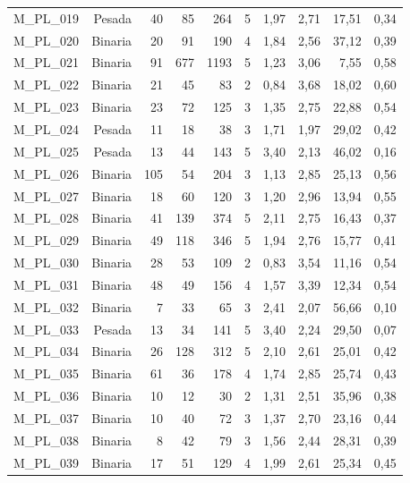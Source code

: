 \begin{table}[ht!]
\begin{tabular}{lrrrrrrrrr}
    M\_PL\_019 & Pesada & 40   & 85   & 264  & 5    & 1,97 & 2,71 & 17,51 & 0,34 \\
    M\_PL\_020 & Binaria & 20   & 91   & 190  & 4    & 1,84 & 2,56 & 37,12 & 0,39 \\
    M\_PL\_021 & Binaria & 91   & 677  & 1193 & 5    & 1,23 & 3,06 & 7,55 & 0,58 \\
    M\_PL\_022 & Binaria & 21   & 45   & 83   & 2    & 0,84 & 3,68 & 18,02 & 0,60 \\
    M\_PL\_023 & Binaria & 23   & 72   & 125  & 3    & 1,35 & 2,75 & 22,88 & 0,54 \\
    M\_PL\_024 & Pesada & 11   & 18   & 38   & 3    & 1,71 & 1,97 & 29,02 & 0,42 \\
    M\_PL\_025 & Pesada & 13   & 44   & 143  & 5    & 3,40 & 2,13 & 46,02 & 0,16 \\
    M\_PL\_026 & Binaria & 105  & 54   & 204  & 3    & 1,13 & 2,85 & 25,13 & 0,56 \\
    M\_PL\_027 & Binaria & 18   & 60   & 120  & 3    & 1,20 & 2,96 & 13,94 & 0,55 \\
    M\_PL\_028 & Binaria & 41   & 139  & 374  & 5    & 2,11 & 2,75 & 16,43 & 0,37 \\
    M\_PL\_029 & Binaria & 49   & 118  & 346  & 5    & 1,94 & 2,76 & 15,77 & 0,41 \\
    M\_PL\_030 & Binaria & 28   & 53   & 109  & 2    & 0,83 & 3,54 & 11,16 & 0,54 \\
    M\_PL\_031 & Binaria & 48   & 49   & 156  & 4    & 1,57 & 3,39 & 12,34 & 0,54 \\
    M\_PL\_032 & Binaria & 7    & 33   & 65   & 3    & 2,41 & 2,07 & 56,66 & 0,10 \\
    M\_PL\_033 & Pesada & 13   & 34   & 141  & 5    & 3,40 & 2,24 & 29,50 & 0,07 \\
    M\_PL\_034 & Binaria & 26   & 128  & 312  & 5    & 2,10 & 2,61 & 25,01 & 0,42 \\
    M\_PL\_035 & Binaria & 61   & 36   & 178  & 4    & 1,74 & 2,85 & 25,74 & 0,43 \\
    M\_PL\_036 & Binaria & 10   & 12   & 30   & 2    & 1,31 & 2,51 & 35,96 & 0,38 \\
    M\_PL\_037 & Binaria & 10   & 40   & 72   & 3    & 1,37 & 2,70 & 23,16 & 0,44 \\
    M\_PL\_038 & Binaria & 8    & 42   & 79   & 3    & 1,56 & 2,44 & 28,31 & 0,39 \\
    M\_PL\_039 & Binaria & 17   & 51   & 129  & 4    & 1,99 & 2,61 & 25,34 & 0,45 \\

\end{tabular}
\end{table}
